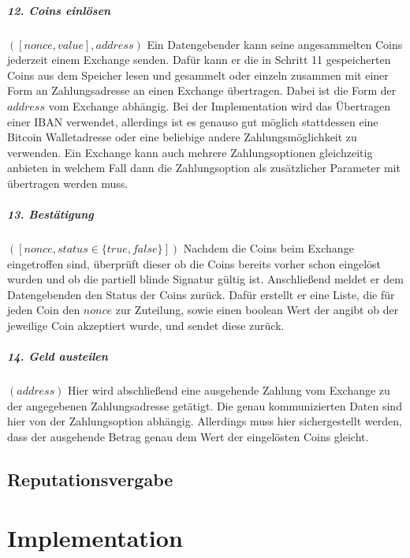 \documentclass[11pt,a4paper]{scrreprt}
\begin{document}
\paragraph{12. Coins einlösen} $([nonce,value], address)$
Ein Datengebender kann seine angesammelten Coins jederzeit einem Exchange senden. Dafür kann er die in Schritt 11 gespeicherten Coins aus dem Speicher lesen und gesammelt oder einzeln zusammen mit einer Form an Zahlungsadresse an einen Exchange übertragen. Dabei ist die Form der $address$ vom Exchange abhängig. Bei der Implementation wird das Übertragen einer IBAN verwendet, allerdings ist es genauso gut möglich stattdessen eine Bitcoin Walletadresse oder eine beliebige andere Zahlungsmöglichkeit zu verwenden. Ein Exchange kann auch mehrere Zahlungsoptionen gleichzeitig anbieten in welchem Fall dann die Zahlungsoption als zusätzlicher Parameter mit übertragen werden muss.

\paragraph{13. Bestätigung} $([nonce, status \in \{true, false\}])$
Nachdem die Coins beim Exchange eingetroffen sind, überprüft dieser ob die Coins bereits vorher schon eingelöst wurden und ob die partiell blinde Signatur gültig ist. Anschließend meldet er dem Datengebenden den Status der Coins zurück. Dafür erstellt er eine Liste, die für jeden Coin den $nonce$ zur Zuteilung, sowie einen boolean Wert der angibt ob der jeweilige Coin akzeptiert wurde, und sendet diese zurück.

\paragraph{14. Geld austeilen} $(address)$
Hier wird abschließend eine ausgehende Zahlung vom Exchange zu der angegebenen Zahlungsadresse getätigt. Die genau kommunizierten Daten sind hier von der Zahlungsoption abhängig. Allerdings muss hier sichergestellt werden, dass der ausgehende Betrag genau dem Wert der eingelösten Coins gleicht.

\section{Reputationsvergabe}




\chapter{Implementation}
\end{document}
